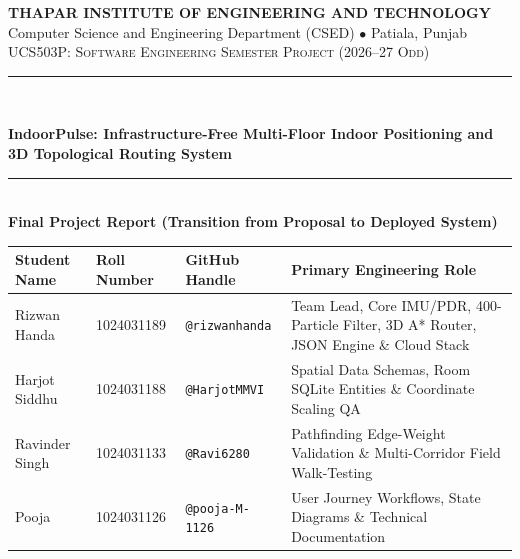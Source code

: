 \documentclass[11pt,a4paper]{article}
\begin{document}
\begin{titlepage}
    \centering
    \vspace*{0.8cm}
    {\Large \textbf{THAPAR INSTITUTE OF ENGINEERING AND TECHNOLOGY}}\\[0.2cm]
    {\normalsize Computer Science and Engineering Department (CSED) $\bullet$ Patiala, Punjab}\\[1.2cm]
    
    {\scshape\large UCS503P: Software Engineering Semester Project (2026--27 Odd)}\\[0.4cm]
    \rule{\linewidth}{0.6mm}\\[0.5cm]
    {\huge \bfseries \baselineskip=28pt IndoorPulse: Infrastructure-Free Multi-Floor Indoor Positioning and 3D Topological Routing System\par}
    \vspace{0.3cm}
    \rule{\linewidth}{0.6mm}\\[0.9cm]

    {\large \textbf{Final Project Report (Transition from Proposal to Deployed System)}}\\[1.0cm]

    \footnotesize
    \renewcommand{\arraystretch}{1.35}
    \begin{tabularx}{\textwidth}{L{2.8cm} L{2.2cm} L{2.8cm} Y}
        \toprule
        \textbf{Student Name} & \textbf{Roll Number} & \textbf{GitHub Handle} & \textbf{Primary Engineering Role} \\
        \midrule
        Rizwan Handa & 1024031189 & \texttt{@rizwanhanda} & Team Lead, Core IMU/PDR, 400-Particle Filter, 3D A* Router, JSON Engine \& Cloud Stack \\
        Harjot Siddhu & 1024031188 & \texttt{@HarjotMMVI} & Spatial Data Schemas, Room SQLite Entities \& Coordinate Scaling QA \\
        Ravinder Singh & 1024031133 & \texttt{@Ravi6280} & Pathfinding Edge-Weight Validation \& Multi-Corridor Field Walk-Testing \\
        Pooja & 1024031126 & \texttt{@pooja-M-1126} & User Journey Workflows, State Diagrams \& Technical Documentation \\
        \bottomrule
    \end{tabularx}
    \normalsize


\end{titlepage}
\end{document}

